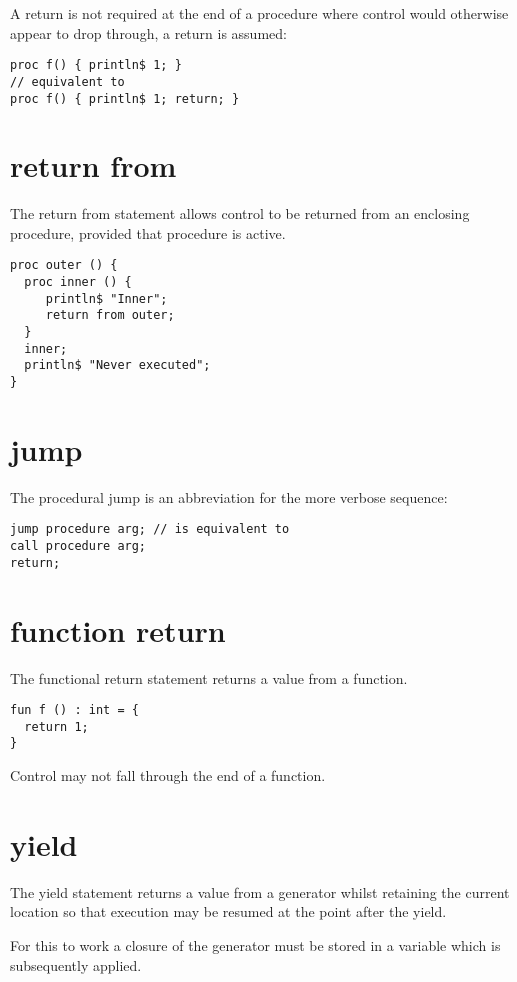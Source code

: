 \documentclass[oneside]{book}
\begin{document}
A return is not required at the end of a procedure
where control would otherwise appear to drop through,
a return is assumed:

\begin{verbatim}
proc f() { println$ 1; }
// equivalent to
proc f() { println$ 1; return; }
\end{verbatim}


\section{return from}
The return from statement allows control to be
returned from an enclosing procedure, provided that
procedure is active.

\begin{verbatim}
proc outer () {
  proc inner () {
     println$ "Inner";
     return from outer;
  }
  inner;
  println$ "Never executed";
}
\end{verbatim}


\section{jump }
The procedural jump is an abbreviation for 
the more verbose sequence:

\begin{verbatim}
jump procedure arg; // is equivalent to
call procedure arg;
return;
\end{verbatim}


\section{function return}
The functional return statement returns a value from
a function.

\begin{verbatim}
fun f () : int = {
  return 1;
}
\end{verbatim}

Control may not fall through the end of a function.

\section{yield}
The yield statement returns a value from a generator
whilst retaining the current location so that execution
may be resumed at the point after the yield.

For this to work a closure of the generator must be stored
in a variable which is subsequently applied.
\end{document}
